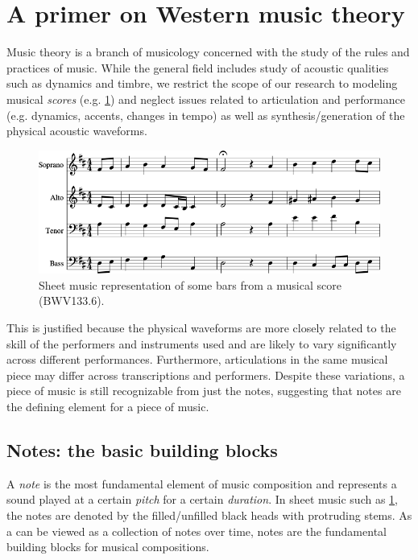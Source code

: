\section{A primer on Western music theory}

Music theory is a branch of musicology concerned with the study of the rules
and practices of music. While the general field includes study of acoustic
qualities such as dynamics and timbre, we restrict the scope of our research to
modeling musical \emph{scores} (e.g. \cref{fig:eg-score}) and neglect issues
related to articulation and performance (e.g. dynamics, accents, changes in
tempo) as well as synthesis/generation of the physical acoustic waveforms.

\begin{figure}[htbp]
    \centering
    \includegraphics[width=0.8\linewidth]{bwv133-6-original-score-1.png}
    \caption{Sheet music representation of some bars from a musical score (BWV133.6).}
    \label{fig:eg-score}
\end{figure}

This is justified because the physical waveforms are more closely related
to the skill of the performers and instruments used and are likely to vary
significantly across different performances. Furthermore, articulations in
the same musical piece may differ across transcriptions and performers.
Despite these variations, a piece of music is still recognizable from just the
notes, suggesting that notes are the defining element for a piece of music.

\subsection{Notes: the basic building blocks}

A \emph{note} is the most fundamental element of music composition and
represents a sound played at a certain \emph{pitch} for a certain
\emph{duration}. In sheet music such as \cref{fig:eg-score}, the notes are
denoted by the filled/unfilled black heads with protruding stems. As a can be
viewed as a collection of notes over time, notes are the fundamental building
blocks for musical compositions.

